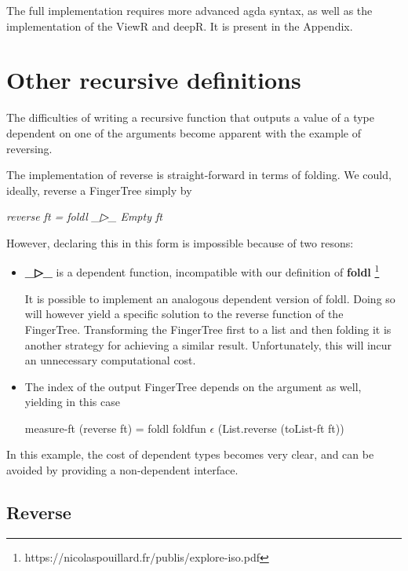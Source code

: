 \documentclass[12pt,twoside,notitlepage]{report}
\begin{document}
The full implementation requires more advanced agda syntax, as well as the implementation of the ViewR and deepR. It is present in the Appendix.

\section{Other recursive definitions}

The difficulties of writing a recursive function that outputs a value of a type dependent on one of the arguments become apparent with the example of reversing.

The implementation of reverse is straight-forward in terms of folding. We could, ideally, reverse a FingerTree simply by 

\begin{center}
\textit{reverse ft = foldl \_▷\_ Empty ft}
\end{center}

However, declaring this in this form is impossible because of two resons:

\begin{itemize}
\item \textbf{\_▷\_} is a dependent function, incompatible with our definition of \textbf{foldl} \footnote{https://nicolaspouillard.fr/publis/explore-iso.pdf}

It is possible to implement an analogous dependent version of foldl. Doing so will however yield a specific solution to the reverse function of the FingerTree.
Transforming the FingerTree first to a list and then folding it is another strategy for achieving a similar result. Unfortunately, this will incur an unnecessary computational cost.
 
\item The index of the output FingerTree depends on the argument as well, yielding in this case 
\begin{center}
measure-ft (reverse ft) = foldl foldfun $\epsilon$ (List.reverse (toList-ft ft))
\end{center}
\end{itemize}

In this example, the cost of dependent types becomes very clear, and can be avoided by providing a non-dependent interface.

\subsection{Reverse}
\end{document}
